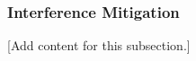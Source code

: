 
\subsubsection{Interference Mitigation}
\label{subsubsec:design_5_4_interference_mitigation}

[Add content for this subsection.]
